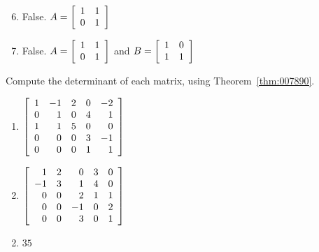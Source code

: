 \begin{multicols}{2}
\begin{ex}
\begin{sol}
\begin{enumerate}[label={\alph*.}]
\setcounter{enumi}{5}
\item  False. $A = \left[ \begin{array}{rr}
1 & 1 \\
0 & 1 
\end{array} \right]$ 


\setcounter{enumi}{7}
\item  False. $A = \left[ \begin{array}{rr}
1 & 1 \\
0 & 1 
\end{array} \right]$ 
 and $B = \left[ \begin{array}{rr}
1 & 0 \\
1 & 1 
\end{array} \right]$ 


\end{enumerate}
\end{sol}
\end{ex}

\columnbreak
\begin{ex}
Compute the determinant of each matrix, using Theorem~\ref{thm:007890}.


\begin{enumerate}[label={\alph*.}]
\item $\left[ \begin{array}{rrrrr}
1 & -1 & 2 & 0 & -2 \\
0 & 1 & 0 & 4 & 1 \\
1 & 1 & 5 & 0 & 0 \\
0 & 0 & 0 & 3 & -1 \\
0 & 0 & 0 & 1 & 1 
\end{array}
\right]$

\item $\left[ \begin{array}{rrrrr}
1 & 2 & 0 & 3 & 0 \\
-1 & 3 & 1 & 4 & 0 \\
0 & 0 & 2 & 1 & 1 \\
0 & 0 & -1 & 0 & 2 \\
0 & 0 & 3 & 0 & 1 
\end{array}
\right]$


\end{enumerate}
\begin{sol}
\begin{enumerate}[label={\alph*.}]
\setcounter{enumi}{1}
\item  $35$

\end{enumerate}
\end{sol}
\end{ex}


\end{multicols}
